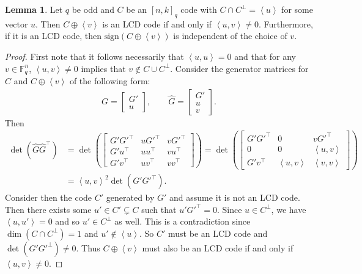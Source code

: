 \documentclass[11pt]{article}
\theoremstyle{definition}
\newtheorem{lemma}[theorem]{Lemma}
\newcommand{\F}{\mathbb{F}}
\newcommand{\Sign}{\mathrm{sign}}
\newcommand{\Ang}[1]{\left\langle#1\right\rangle}
\begin{document}
\begin{lemma}\label{lem:non-lcd-subcode-augmentation}
	Let $q$ be odd and $C$ be an ${[n, k]}_q$ code with $C \cap C^\bot = \Ang{u}$ for some vector $u$.
	Then $C \oplus \Ang{v}$ is an LCD code if and only if $\Ang{u, v} \neq 0$.
	Furthermore, if it is an LCD code, then $\Sign(C \oplus \Ang{v})$ is independent of the choice of $v$.
\end{lemma}

\begin{proof}
	First note that it follows necessarily that $\Ang{u, u} = 0$ and that for any $v \in \F_q^n$, $\Ang{u, v} \neq 0$ implies that $v \notin C \cup C^\bot$.
	Consider the generator matrices for $C$ and $C \oplus \Ang{v}$ of the following form:
	\begin{align*}
		G = \begin{bmatrix} G' \\ u \end{bmatrix},
		\qquad
		\hat{G} = \begin{bmatrix} G' \\ u \\ v \end{bmatrix}.
	\end{align*}
	Then
	\begin{align*}
		\det(\hat{G} \hat{G}^\top)
		&= \det \left( \begin{bmatrix}
			G' G'^\top & u G'^\top & v G'^\top \\
			G' u^\top  & u u^\top  & v u^\top  \\
			G' v^\top  & u v^\top  & v v^\top
		\end{bmatrix} \right)
		= \det \left( \begin{bmatrix}
			G' G'^\top & 0		  & v G'^\top  \\
			0		  & 0		  & \Ang{u, v} \\
			G' v^\top  & \Ang{u, v} & \Ang{v, v}
		\end{bmatrix} \right) \\
		&= {\Ang{u, v}}^2 \det(G' G'^\top).
	\end{align*}
	Consider then the code $C'$ generated by $G'$ and assume it is not an LCD code.
	Then there exists some $u' \in C' \subsetneq C$ such that $u' G'^\top = 0$.
	Since $u \in C^\bot$, we have $\Ang{u, u'} = 0$ and so $u' \in C^\bot$ as well.
	This is a contradiction since $\dim(C \cap C^\bot) = 1$ and $u' \notin \Ang{u}$.
	So $C'$ must be an LCD code and $\det(G' G'^\bot) \neq 0$.
	Thus $C \oplus \Ang{v}$ must also be an LCD code if and only if $\Ang{u, v} \neq 0$.


\end{proof}
\end{document}
